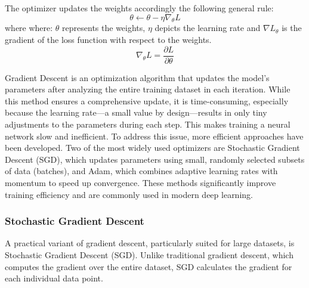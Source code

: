 The optimizer updates the weights accordingly the following general rule:
\begin{equation}
    \theta \leftarrow \theta - \eta \nabla_\theta L
\end{equation}
where where: $\theta$ represents the weights, $\eta$ depicts the learning rate and $\nabla L_\theta$ is the gradient of the loss function with respect to the weights. 
\begin{equation}
    \nabla_\theta L = \frac{\partial L}{\partial \theta}
\end{equation}

Gradient Descent is an optimization algorithm that updates the model's parameters after analyzing the entire training dataset in each iteration. While this method ensures a comprehensive update, it is time-consuming, especially because the learning rate—a small value by design—results in only tiny adjustments to the parameters during each step. This makes training a neural network slow and inefficient. To address this issue, more efficient approaches have been developed. Two of the most widely used optimizers are Stochastic Gradient Descent (SGD), which updates parameters using small, randomly selected subsets of data (batches), and Adam, which combines adaptive learning rates with momentum to speed up convergence. These methods significantly improve training efficiency and are commonly used in modern deep learning.

\subsubsection*{Stochastic Gradient Descent}
A practical variant of gradient descent, particularly suited for large datasets, is Stochastic Gradient Descent (SGD). Unlike traditional gradient descent, which computes the gradient over the entire dataset, SGD calculates the gradient for each individual data point.

